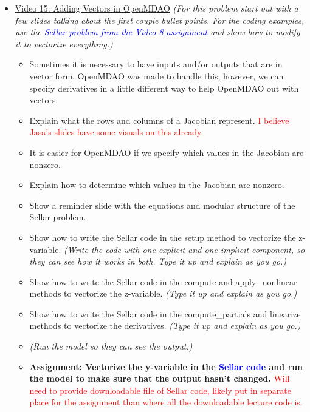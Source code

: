 \documentclass[12pt, letterpaper]{article}
\begin{document}
\begin{itemize}
	\item \underline{Video 15: Adding Vectors in OpenMDAO} \textit{(For this problem start out with a few slides talking about the first couple bullet points. For the coding examples, use the \textcolor{blue}{Sellar problem from the Video 8 assignment} and show how to modify it to vectorize everything.)}
		\begin{itemize}
			\item 	Sometimes it is necessary to have inputs and/or outputs that are in vector form. OpenMDAO was made to handle this, however, we can specify derivatives in a little different way to help OpenMDAO out with vectors.
			\item Explain what the rows and columns of a Jacobian represent. \textcolor{red}{I believe Jasa's slides have some visuals on this already.}
			\item It is easier for OpenMDAO if we specify which values in the Jacobian are nonzero.
			\item Explain how to determine which values in the Jacobian are nonzero.
			\item Show a reminder slide with the equations and modular structure of the Sellar problem.
			\item Show how to write the Sellar code in the setup method to vectorize the z-variable. \textit{(Write the code with one explicit and one implicit component, so they can see how it works in both. Type it up and explain as you go.)}
			\item Show how to write the Sellar code in the compute and apply\_nonlinear methods to vectorize the z-variable.  \textit{(Type it up and explain as you go.)}
			\item Show how to write the Sellar code in the compute\_partials and linearize methods to vectorize the derivatives. \textit{(Type it up and explain as you go.)}
			\item \textit{(Run the model so they can see the output.)}
			\item \textbf{Assignment: Vectorize the y-variable in the \textcolor{blue}{Sellar code} and run the model to make sure that the output hasn’t changed.} \textcolor{red}{Will need to provide downloadable file of Sellar code, likely put in separate place for the assignment than where all the downloadable lecture code is.}
		\end{itemize}
		

\end{itemize}
\end{document}
